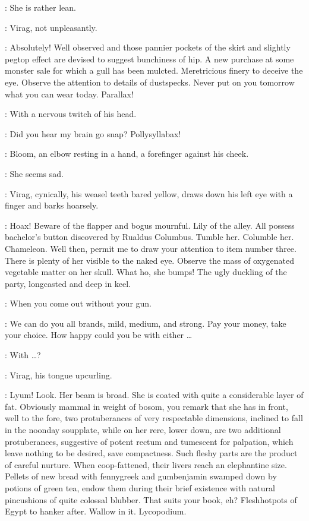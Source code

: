 \Bloom:
She is rather lean.

:
Virag,
not unpleasantly.

\Virag:
Absolutely!
Well observed and those pannier pockets of the skirt
and slightly pegtop effect are devised to suggest bunchiness of hip.
A new purchase at some monster sale for which a gull has been mulcted.
Meretricious finery to deceive the eye.
Observe the attention to details of dustspecks.
Never put on you tomorrow what you can wear today.
Parallax!

:
With a nervous twitch of his head.

\Virag:
Did you hear my brain go snap?
Pollysyllabax!

:
Bloom,
an elbow resting in a hand,
a forefinger against his cheek.

\Bloom:
She seems sad.

:
Virag,
cynically,
his weasel teeth bared yellow,
draws down his left eye
with a finger and barks hoarsely.

\Virag:
Hoax!
Beware of the flapper and bogus mournful.
Lily of the alley.
All possess bachelor's button discovered by Rualdus Columbus.
Tumble her.
Columble her.
Chameleon.
Well then,
permit me to draw your attention to item number three.
There is plenty of her visible to the naked eye.
Observe the mass of oxygenated vegetable matter on her skull.
What ho,
she bumps!
The ugly duckling of the party,
longcasted and deep in keel.

\Bloom:
When you come out without your gun.

\Virag:
We can do you all brands,
mild,
medium,
and strong.
Pay your money,
take your choice.
How happy could you be with either \ldots

\Bloom:
With \ldots?

:
Virag,
his tongue upcurling.

\Virag:
Lyum!
Look.
Her beam is broad.
She is coated with quite a considerable layer of fat.
Obviously mammal in weight of bosom,
you remark that she has in front,
well to the fore,
two protuberances of very respectable dimensions,
inclined to fall in the noonday soupplate,
while on her rere,
lower down,
are two additional protuberances,
suggestive of potent rectum and tumescent for palpation,
which leave nothing to be desired,
save compactness.
Such fleshy parts are the product of careful nurture.
When coop-fattened,
their livers reach an elephantine size.
Pellets of new bread with fennygreek and gumbenjamin
swamped down by potions of green tea,
endow them during their brief existence
with natural pincushions of quite colossal blubber.
That suits your book,
eh?
Fleshhotpots of Egypt to hanker after.
Wallow in it.
Lycopodium.

